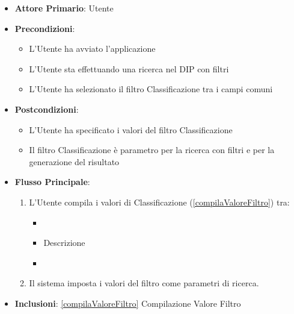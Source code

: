 \begin{itemize}
      \item \textbf{Attore Primario}: Utente
      \item \textbf{Precondizioni}:  \begin{itemize}
            \item L'Utente ha avviato l'applicazione
            \item L'Utente sta effettuando una ricerca nel DIP con filtri
            \item L'Utente ha selezionato il filtro Classificazione tra i campi comuni
      \end{itemize}
      \item \textbf{Postcondizioni}: \begin{itemize}
            \item L'Utente ha specificato i valori del filtro Classificazione
            \item Il filtro Classificazione è parametro per la ricerca con filtri e per la generazione del risultato
      \end{itemize}
      \item \textbf{Flusso Principale}:
            \begin{enumerate}
                  \item L'Utente compila i valori di Classificazione (\ref{compilaValoreFiltro}) tra:
                        \begin{itemize}
                              \item {}
                              \item Descrizione
                              \item {}
                        \end{itemize}
                  \item Il sistema imposta i valori del filtro come parametri di ricerca.
            \end{enumerate}
      \item \textbf{Inclusioni}: \ref{compilaValoreFiltro} Compilazione Valore Filtro
\end{itemize}

